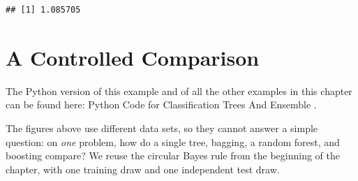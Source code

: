 \documentclass[
]{book}
\begin{document}
\begin{verbatim}
## [1] 1.085705
\end{verbatim}

\vspace{1.2em}

\section{A Controlled Comparison}\label{a-controlled-comparison}

The Python version of this example and of all the other examples in this chapter can be found here: Python Code for Classification Trees And Ensemble .~

The figures above use different data sets, so they cannot answer a simple question: on \emph{one} problem, how do a single tree, bagging, a random forest, and boosting compare? We reuse the circular Bayes rule from the beginning of the chapter, with one training draw and one independent test draw.
\end{document}

